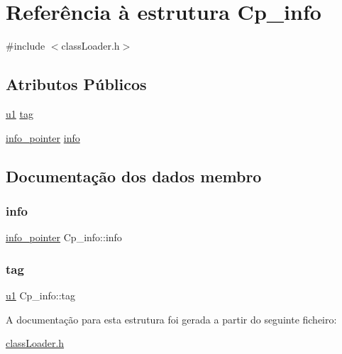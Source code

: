 \hypertarget{struct_cp__info}{}\section{Referência à estrutura Cp\+\_\+info}
\label{struct_cp__info}


{\ttfamily \#include $<$class\+Loader.\+h$>$}

\subsection*{Atributos Públicos}
\begin{DoxyCompactItemize}
\item 
\hyperlink{util_8h_a64f8055b64cf2a4c299c841130c5c938}{u1} \hyperlink{struct_cp__info_ab0c1256377889071c5a1af7f6ce4486f}{tag}
\item 
\hyperlink{unioninfo__pointer}{info\+\_\+pointer} \hyperlink{struct_cp__info_a705b184b032d6962d3d23b16039cdc56}{info}
\end{DoxyCompactItemize}


\subsection{Documentação dos dados membro}
\mbox{\label{struct_cp__info_a705b184b032d6962d3d23b16039cdc56}} 
\subsubsection{\texorpdfstring{info}{info}}
{\footnotesize\ttfamily \hyperlink{unioninfo__pointer}{info\+\_\+pointer} Cp\+\_\+info\+::info}

\mbox{\label{struct_cp__info_ab0c1256377889071c5a1af7f6ce4486f}} 
\subsubsection{\texorpdfstring{tag}{tag}}
{\footnotesize\ttfamily \hyperlink{util_8h_a64f8055b64cf2a4c299c841130c5c938}{u1} Cp\+\_\+info\+::tag}



A documentação para esta estrutura foi gerada a partir do seguinte ficheiro\+:\begin{DoxyCompactItemize}
\item 
\hyperlink{class_loader_8h}{class\+Loader.\+h}\end{DoxyCompactItemize}
